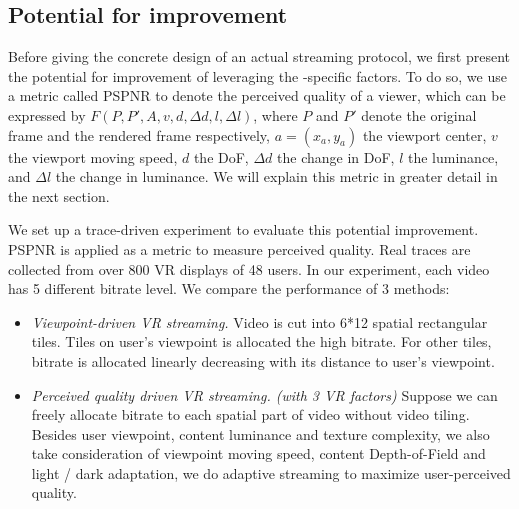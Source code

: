 


\subsection{Potential for improvement}
\label{subsec:potentials}

Before giving the concrete design of an actual streaming protocol, we first present the potential for improvement of leveraging the \vr-specific factors. 
To do so, we use a metric called PSPNR to denote the perceived quality of a viewer, which can be expressed by $F(P,P',A,v,d,\Delta d,l,\Delta l)$, where $P$ and $P'$ denote the original frame and the rendered frame respectively, $a=(x_a,y_a)$ the viewport center, $v$ the viewport moving speed, $d$ the DoF, $\Delta d$ the change in DoF, $l$ the luminance, and $\Delta l$ the change in luminance. 
We will explain this metric in greater detail in the next section. 


We set up a trace-driven experiment to evaluate this potential improvement. PSPNR \cite{PSPNR} is applied as a metric to measure perceived quality. Real traces are collected from over 800 VR displays of 48 users. In our experiment, each video has 5 different bitrate level. We compare the performance of 3 methods:
\begin{itemize}

\item \emph{Viewpoint-driven VR streaming.} Video is cut into 6*12 spatial rectangular tiles. Tiles on user's viewpoint is allocated the high bitrate. For other tiles, bitrate is allocated linearly decreasing with its distance to user's viewpoint.

\item \emph{Perceived quality driven VR streaming. (with 3 VR factors)} Suppose we can freely allocate bitrate to each spatial part of video without video tiling. Besides user viewpoint, content luminance and texture complexity, we also take consideration of viewpoint moving speed, content Depth-of-Field and light / dark adaptation, we do adaptive streaming to maximize user-perceived quality.

\end{itemize}

